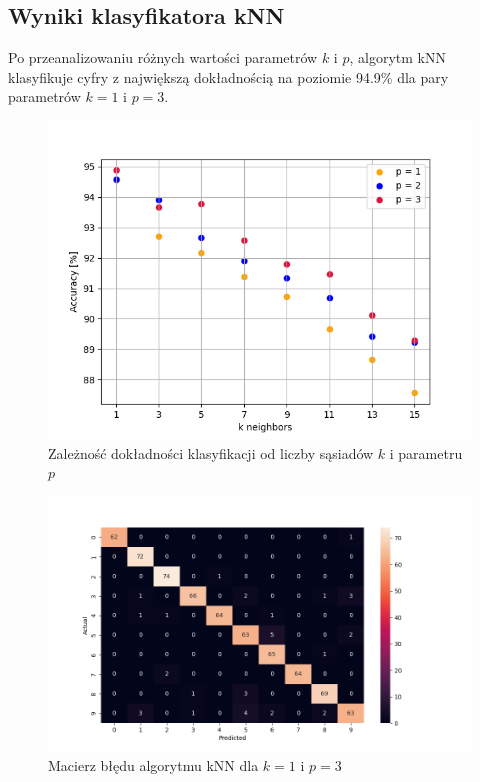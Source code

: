 \documentclass[12pt,a4paper]{article}
\begin{document}
\subsection{Wyniki klasyfikatora kNN}
Po przeanalizowaniu różnych wartości parametrów $k$ i $p$, algorytm kNN klasyfikuje cyfry
z największą dokładnością na poziomie 94.9\% dla pary parametrów $k = 1$ i $p = 3$.
\newpage
\begin{figure}[!h]
	\includegraphics[scale=0.70]{"knn.png"}
	\centering
	\caption{Zależność dokładności klasyfikacji od liczby sąsiadów $k$ i parametru $p$}
\end{figure}
\begin{figure}[!h]
	\includegraphics[scale=0.70]{"confusion_matrix_knn.png"}
	\centering
	\caption{Macierz błędu algorytmu kNN dla $k = 1$ i $p = 3$}
\end{figure}
\end{document}
